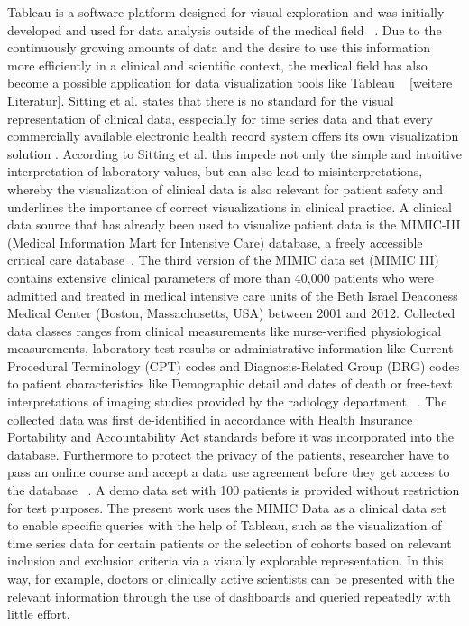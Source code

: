 Tableau is a software platform designed for visual exploration and was initially developed and used for data analysis outside of the medical field ~\cite{Tableau.2021}. Due to the continuously growing amounts of data and the desire to use this information more efficiently in a clinical and scientific context, the medical field has also become a possible application for data visualization tools like Tableau ~\cite{Ko.2017} [weitere Literatur]. 
Sitting et al. states that there is no standard for the visual representation of clinical data, esspecially for time series data and that every commercially available electronic health record system offers its own visualization solution \cite{Sittig.2015}. According to Sitting et al. this impede not only the simple and intuitive interpretation of laboratory values, but can also lead to misinterpretations, whereby the visualization of clinical data is also relevant for patient safety and underlines the importance of correct visualizations in clinical practice.
A clinical data source that has already been used to visualize patient data is the MIMIC-III (Medical Information Mart for Intensive Care) database, a freely accessible critical care database~\cite{Festag.2019,Lee.2016,Johnson.2020,Johnson.2016}. The third version of the MIMIC data set (MIMIC III) contains extensive clinical parameters of more than 40,000 patients who were admitted and treated in medical intensive care units of the Beth Israel Deaconess Medical Center (Boston, Massachusetts, USA) between 2001 and 2012. Collected data classes ranges from clinical measurements like nurse-verified physiological measurements, laboratory test results or administrative information like Current Procedural Terminology (CPT) codes and Diagnosis-Related Group (DRG) codes to patient characteristics like Demographic detail and dates of death or free-text interpretations of imaging studies provided by the radiology department ~\cite{Johnson.2020,Johnson.2016}. The collected data was first de-identified in accordance with Health Insurance Portability and Accountability Act standards before it was incorporated into the database. Furthermore to protect the privacy of the patients, researcher have to pass an online course and accept a data use agreement before they get access to the database ~\cite{Johnson.2020,Johnson.2016}. A demo data set with 100 patients is provided without restriction for test purposes. 
The present work uses the MIMIC Data as a clinical data set to enable specific queries with the help of Tableau, such as the visualization of time series data for certain patients or the selection of cohorts based on relevant inclusion and exclusion criteria via a visually explorable representation. In this way, for example, doctors or clinically active scientists can be presented with the relevant information through the use of dashboards and queried repeatedly with little effort.